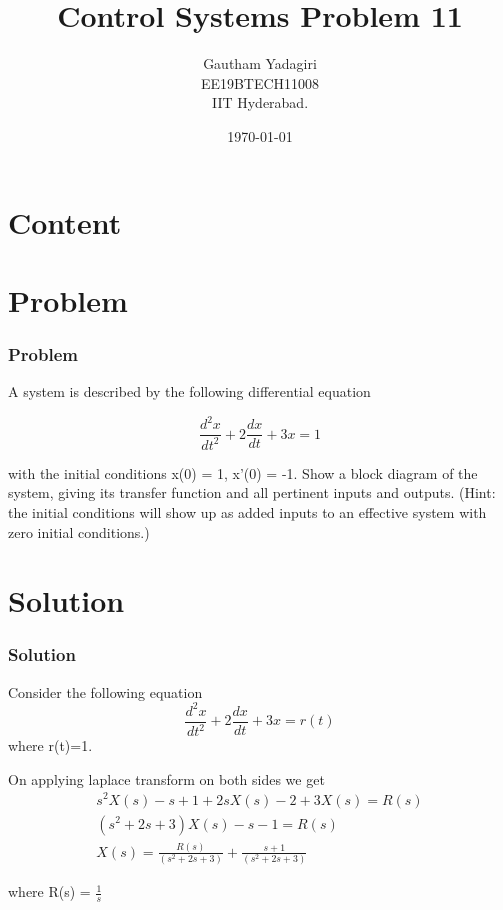 \documentclass{beamer}
\title{Control Systems Problem 11}
\author{Gautham Yadagiri\\ EE19BTECH11008\\IIT Hyderabad.}
\date{\today}
\theoremstyle{remark}
\numberwithin{equation}{section}
\begin{document}
\begin{frame}
\titlepage
\end{frame}

\section*{Content}
\begin{frame}
\tableofcontents
\end{frame}
\section{Problem}
\begin{frame}
\frametitle{Problem}
A system is described by the following differential
equation

\begin{equation}
\frac{d^2x}{dt^2}+2\frac{dx}{dt}+3x=1
\end{equation}

with the initial conditions x(0) = 1, x'(0) = -1.
Show a block diagram of the system, giving its
transfer function and all pertinent inputs and outputs.
(Hint: the initial conditions will show up as
added inputs to an effective system with zero initial
conditions.)
\end{frame}


\section{Solution}
\begin{frame}
\frametitle{Solution}
Consider the following equation
\begin{equation}
\frac{d^2x}{dt^2}+2\frac{dx}{dt}+3x=r(t)
\end{equation}
where r(t)=1.
\vspace{2mm}

On applying laplace transform on both sides we get
\begin{align}
s^2X(s)-s+1+2sX(s)-2+3X(s) = R(s)
\nonumber\\
(s^2+2s+3)X(s)-s-1 = R(s)
\nonumber\\
X(s) = \frac{R(s)}{(s^2+2s+3)}+\frac{s+1}{(s^2+2s+3)}
\end{align}

where R(s) = $\frac{1}{s}$

\end{frame}
\end{document}

